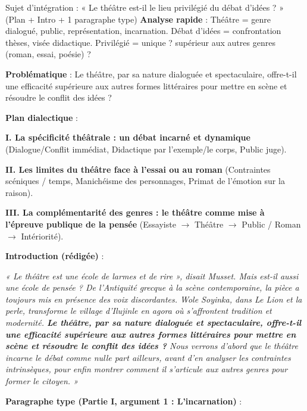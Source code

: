 \documentclass[11pt]{article}
\newcommand{\cle}[1]{{\popxbold\color{popdark}#1}}
\begin{document}
\begin{exoresolu}{Sujet d'intégration : « Le théâtre est-il le lieu privilégié du débat d'idées ? » (Plan + Intro + 1 paragraphe type)}
\textbf{Analyse rapide} : \cle{Théâtre} = genre dialogué, public, représentation, incarnation. \cle{Débat d'idées} = confrontation thèses, visée didactique. \cle{Privilégié} = unique ? supérieur aux autres genres (roman, essai, poésie) ?\par
\textbf{Problématique} : Le théâtre, par sa nature dialoguée et spectaculaire, offre-t-il une efficacité supérieure aux autres formes littéraires pour mettre en scène et résoudre le conflit des idées ?\par
\textbf{Plan dialectique} :\par
\textbf{I. La spécificité théâtrale : un débat incarné et dynamique} (Dialogue/Conflit immédiat, Didactique par l'exemple/le corps, Public juge).\par
\textbf{II. Les limites du théâtre face à l'essai ou au roman} (Contraintes scéniques / temps, Manichéisme des personnages, Primat de l'émotion sur la raison).\par
\textbf{III. La complémentarité des genres : le théâtre comme mise à l'épreuve publique de la pensée} (Essayiste $\rightarrow$ Théâtre $\rightarrow$ Public / Roman $\rightarrow$ Intériorité).\par
\textbf{Introduction (rédigée)} :\par
\emph{« Le théâtre est une école de larmes et de rire », disait Musset. Mais est-il aussi une école de pensée ? De l'Antiquité grecque à la scène contemporaine, la pièce a toujours mis en présence des voix discordantes. Wole Soyinka, dans \emph{Le Lion et la perle}, transforme le village d'Ilujinle en agora où s'affrontent tradition et modernité. \textbf{Le théâtre, par sa nature dialoguée et spectaculaire, offre-t-il une efficacité supérieure aux autres formes littéraires pour mettre en scène et résoudre le conflit des idées ?} Nous verrons d'abord que le théâtre incarne le débat comme nulle part ailleurs, avant d'en analyser les contraintes intrinsèques, pour enfin montrer comment il s'articule aux autres genres pour former le citoyen. »}\par
\textbf{Paragraphe type (Partie I, argument 1 : L'incarnation)} :\par

\end{exoresolu}
\end{document}
